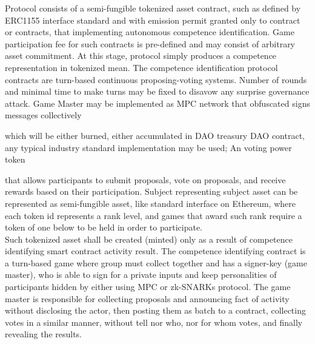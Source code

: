 \documentclass{article}
\begin{document}
\begin{CJK}{UTF8}{gbsn}
\begin{multicols}{2}
        \end{multicols}
        
        \begin{multicols}{2}



        Protocol consists of a semi-fungible tokenized asset contract, such as defined by ERC1155\cite{EIP1155} interface standard and with emission permit granted only to contract or contracts, that implementing autonomous competence identification. Game participation fee for such contracts is pre-defined and may consist of arbitrary asset commitment.
        At this stage, protocol simply produces a competence representation in tokenized mean. The competence identification protocol contracts are turn-based continuous proposing-voting systems. Number of rounds and minimal time to make turns may be fixed to disavow any surprise governance attack. Game Master may be implemented as MPC network that obfuscated signs messages collectively

        which will be either burned, either accumulated in DAO treasury      DAO contract, any typical industry standard implementation may be used; An voting power token


        that allows participants to submit proposals, vote on proposals, and receive rewards based on their participation. Subject representing subject asset can be represented as semi-fungible asset, like standard interface on Ethereum, where each token id represents a rank level, and games that award such rank require a token of one below to be held in order to participate. \\ Such tokenized asset shall be created (minted) only as a result of competence identifying smart contract activity result. The competence identifying contract is a turn-based game where group must collect together and has a signer-key (game master), who is able to sign for a private inputs and keep personalities of participants hidden by either using MPC or zk-SNARKs protocol.
        The game master is responsible for collecting proposals and announcing fact of activity without disclosing the actor, then posting them as batch to a contract, collecting votes in a similar manner, without tell nor who, nor for whom votes, and finally revealing the results.\\




\end{multicols}
\end{CJK}
\end{document}
